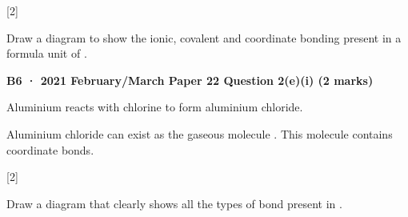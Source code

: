\documentclass[10pt,a4paper]{article}
\newcommand{\drawbox}[1][3.8cm]{%
  \par\vspace{0.10em}%
  \noindent\fbox{\parbox[c][#1][c]{\dimexpr\linewidth-2\fboxsep-2\fboxrule\relax}{\strut}}%
  \par
}
\newcommand{\qhead}[2]{%
  \par\vspace{0.28em}%
  \Needspace{4.2em}%
  \noindent{\small\textbf{#1}}\hfill{\small[#2]}\par\vspace{0.08em}%
}
\begin{document}
\vspace{0.08em}
\centering
{\small {}}
\par\raggedright

\qhead{B5(a)}{2}
{\small Draw a diagram to show the ionic, covalent and coordinate bonding present in a formula unit of .}
\drawbox[4.8cm]

\vspace{0.25em}
{\normalsize\bfseries B6 · 2021 February/March Paper 22 Question 2(e)(i) (2 marks)}\par

{\small Aluminium reacts with chlorine to form aluminium chloride.}

{\small Aluminium chloride can exist as the gaseous molecule . This molecule contains coordinate bonds.}

\qhead{B6(e)(i)}{2}
{\small Draw a diagram that clearly shows all the types of bond present in .}
\drawbox[4.8cm]
\end{document}
